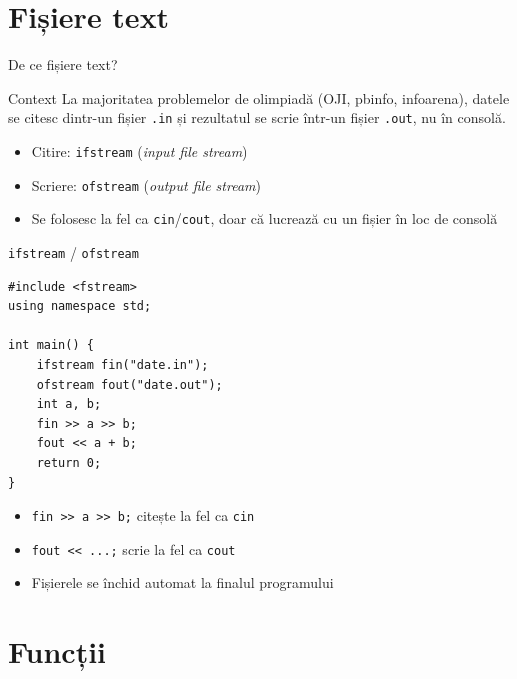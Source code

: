 ﻿\documentclass{beamer}
\begin{document}
\section{Fișiere text}

\begin{frame}{De ce fișiere text?}
  \begin{block}{Context}
    La majoritatea problemelor de olimpiadă (OJI, pbinfo, infoarena), datele se citesc dintr-un fișier \texttt{.in} și rezultatul se scrie într-un fișier \texttt{.out}, nu în consolă.
  \end{block}

  \smallskip
  \begin{itemize}
    \item Citire: \texttt{ifstream} (\emph{input file stream})
    \item Scriere: \texttt{ofstream} (\emph{output file stream})
    \item Se folosesc la fel ca \texttt{cin}/\texttt{cout}, doar că lucrează cu un fișier în loc de consolă
  \end{itemize}
\end{frame}

\begin{frame}[fragile]{\texttt{ifstream} / \texttt{ofstream}}
  \begin{lstlisting}
#include <fstream>
using namespace std;

int main() {
    ifstream fin("date.in");
    ofstream fout("date.out");
    int a, b;
    fin >> a >> b;
    fout << a + b;
    return 0;
}
  \end{lstlisting}
  \begin{itemize}
    \item \lstinline|fin >> a >> b;| citește la fel ca \lstinline|cin|
    \item \lstinline|fout << ...;| scrie la fel ca \lstinline|cout|
    \item Fișierele se închid automat la finalul programului
  \end{itemize}
\end{frame}

\section{Funcții}
\end{document}
